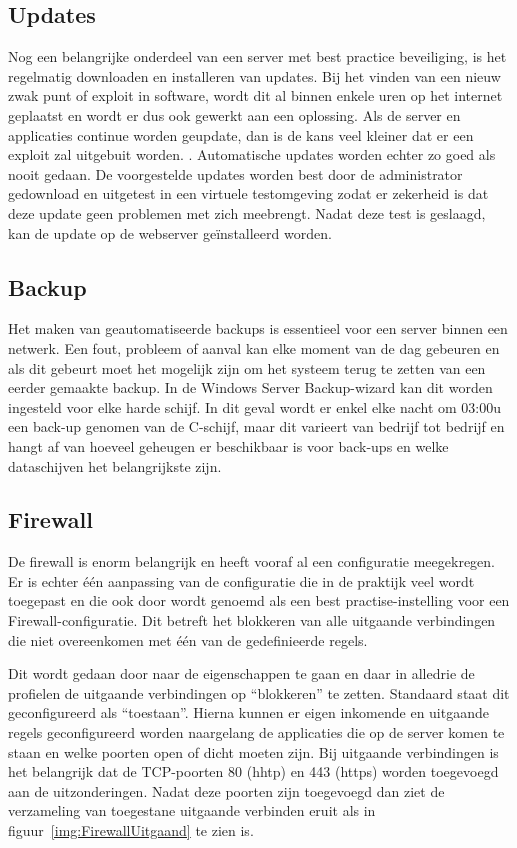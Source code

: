 \documentclass[pdftex,a4paper,12pt]{report}
\begin{document}
\subsection{Updates}
Nog een belangrijke onderdeel van een server met best practice beveiliging, is het regelmatig downloaden en installeren van updates. Bij het vinden van een nieuw zwak punt of exploit in software, wordt dit al binnen enkele uren op het internet geplaatst en wordt er dus ook gewerkt aan een oplossing. Als de server en applicaties continue worden geupdate, dan is de kans veel kleiner dat er een exploit zal uitgebuit worden. \citep{Cott2012}. Automatische updates worden echter zo goed als nooit gedaan. De voorgestelde updates worden best door de administrator gedownload en uitgetest in een virtuele testomgeving zodat er zekerheid is dat deze update geen problemen met zich meebrengt. Nadat deze test is geslaagd, kan de update op de webserver geïnstalleerd worden.

\subsection{Backup}
Het maken van geautomatiseerde backups is essentieel voor een server binnen een netwerk. Een fout, probleem of aanval kan elke moment van de dag gebeuren en als dit gebeurt moet het mogelijk zijn om het systeem terug te zetten van een eerder gemaakte backup. In de Windows Server Backup-wizard kan dit worden ingesteld voor elke harde schijf. In dit geval wordt er enkel elke nacht om 03:00u een back-up genomen van de C-schijf, maar dit varieert van bedrijf tot bedrijf en hangt af van hoeveel geheugen er beschikbaar is voor back-ups en welke dataschijven het belangrijkste zijn. 

\subsection{Firewall}
De firewall is enorm belangrijk en heeft vooraf al een configuratie meegekregen. Er is echter één aanpassing van de configuratie die in de praktijk veel wordt toegepast en die ook door \cite{Nabors2013} wordt genoemd als een best practise-instelling voor een Firewall-configuratie. Dit betreft het blokkeren van alle uitgaande verbindingen die niet overeenkomen met één van de gedefinieerde regels. \newline 

Dit wordt gedaan door naar de eigenschappen te gaan en daar in alledrie de profielen de uitgaande verbindingen op "`blokkeren"' te zetten. Standaard staat dit geconfigureerd als "`toestaan"'. Hierna kunnen er eigen inkomende en uitgaande regels geconfigureerd worden naargelang de applicaties die op de server komen te staan en welke poorten open of dicht moeten zijn. Bij uitgaande verbindingen is het belangrijk dat de TCP-poorten 80 (hhtp) en 443 (https) worden toegevoegd aan de uitzonderingen. Nadat deze poorten zijn toegevoegd dan ziet de verzameling van toegestane uitgaande verbinden eruit als in figuur~\ref{img:FirewallUitgaand} te zien is.
\end{document}
